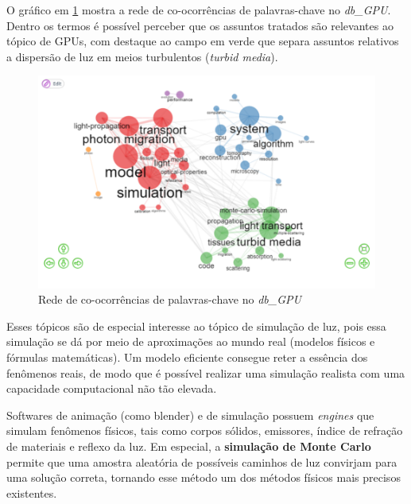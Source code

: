 O gráfico em \ref{fig:gpu-co-occur} mostra a rede de co-ocorrências de palavras-chave no \textit{db\_GPU}. Dentro os termos é possível perceber que os assuntos tratados são relevantes ao tópico de GPUs, com destaque ao campo em verde que separa assuntos relativos a dispersão de luz em meios turbulentos (\textit{turbid media}).

\begin{figure}[ht]
    \includegraphics[width=12cm]{experiments/gustavo-tomas/AnaliseBibliometrica/GPUs/Graficos/gpu-co-ocurr.png}
    \caption{Rede de co-ocorrências de palavras-chave no \textit{db\_GPU}}
    \label{fig:gpu-co-occur}
\end{figure}

Esses tópicos são de especial interesse ao tópico de simulação de luz, pois essa simulação se dá por meio de aproximações ao mundo real (modelos físicos e fórmulas matemáticas). Um modelo eficiente consegue reter a essência dos fenômenos reais, de modo que é possível realizar uma simulação realista com uma capacidade computacional não tão elevada.

Softwares de animação (como blender) e de simulação possuem \textit{engines} que simulam fenômenos físicos, tais como corpos sólidos, emissores, índice de refração de materiais e reflexo da luz. Em especial, a \textbf{simulação de Monte Carlo} permite que uma amostra aleatória de possíveis caminhos de luz convirjam para uma solução correta, tornando esse método um dos métodos físicos mais precisos existentes.

